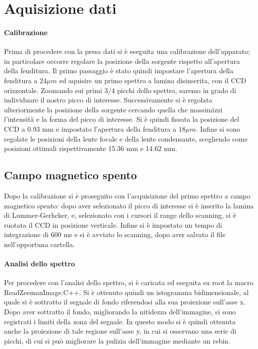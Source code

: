 \documentclass{article}
\begin{document}
	\section*{Aquisizione dati}
	
	\paragraph{Calibrazione}
	Prima di procedere con la presa dati si è eseguita una calibrazione 
	dell'apparato; in particolare occorre regolare la posizione 
	della sorgente rispetto all'apertura della fenditura.
	Il primo passaggio è stato quindi impostare l'apertura della fenditura 
	a $24 \mu m$ ed aquisire un primo spettro a lamina disinserita, con il 
	CCD orizzontale. Zoomando sui primi 3/4 picchi dello spettro, saremo
	in grado di individuare il nostro picco di interesse.
	Successivamente si è regolata ulteriormente la posizione della sorgente 
	cercando quella che massimizzi l'intensità e la forma del picco di 
	interesse.
	Si è quindi fissata la posizione del CCD a 0.93 mm e impostato l'apertura 
	della fenditura a $18 \mu m$.
	Infine si sono regolate le posizioni della lente focale e della lente 
	condensante, scegliendo come posizioni ottimali rispettivamente 15.36 mm 
	e 14.62 mm.


	\subsection*{Campo magnetico spento}

	Dopo la calibrazione si è proseguito con l'acquisizione del primo 
	spettro a campo magnetico spento: dopo aver selezionato il picco di 
	interesse si è inserito la lamina di Lummer-Gerhcker, e, selezionato 
	con i cursori il range dello scanning, si è ruotata il CCD
	in posizione verticale.
	Infine si è impostato un tempo di integrazione di 600 ms e si è avviato
	lo scanning, dopo aver salvato il file nell'opportuna cartella.


	\paragraph{Analisi dello spettro}
	Per procedere con l'analisi dello spettro, si è caricata ed eseguita su root la macro ReadZeemanImage.C++. 
	Si è ottenuto quindi un istogramma bidimensionale, al quale si è sottratto il segnale di fondo riferendosi alla sua proiezione sull’asse x.
	Dopo aver sottratto il fondo, migliorando la nitidezza dell'immagine, si sono registrati i limiti della zona del segnale. 
	In questo modo si è quindi ottenuta anche la proiezione di tale regione sull’asse y, in cui si osservano una serie di picchi, 
	di cui si può migliorare la pulizia dell'immagine mediante un rebin.
\end{document}
